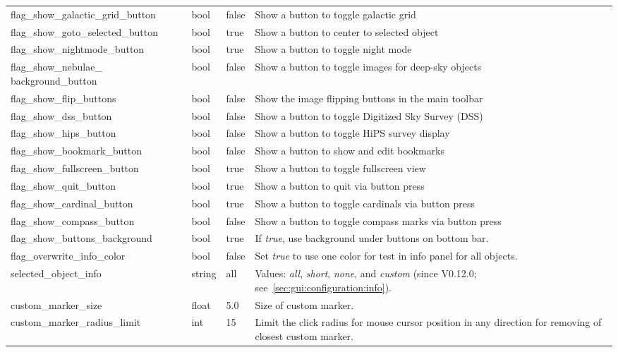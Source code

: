 \begin{longtable}{p{50mm}|l|l|p{55mm}}
flag\_show\_galactic\_grid\_button     & bool  & false & Show a button to toggle galactic grid\\
flag\_show\_goto\_selected\_button     & bool  & true  & Show a button to center to selected object\\
flag\_show\_nightmode\_button          & bool  & true  & Show a button to toggle night mode\\
flag\_show\_nebulae\_ \mbox{background\_button} & bool & false & Show a button to toggle images for deep-sky objects\\%
flag\_show\_flip\_buttons              & bool  & false & Show the image flipping buttons in the main toolbar \\%
flag\_show\_dss\_button                & bool  & false & Show a button to toggle Digitized Sky Survey (DSS)\\%
flag\_show\_hips\_button               & bool  & false & Show a button to toggle HiPS survey display\\%
flag\_show\_bookmark\_button           & bool  & false & Show a button to show and edit bookmarks\\
flag\_show\_fullscreen\_button         & bool  & true  & Show a button to toggle fullscreen view\\
flag\_show\_quit\_button               & bool  & true  & Show a button to quit via button press\\
flag\_show\_cardinal\_button           & bool  & true  & Show a button to toggle cardinals via button press\\
flag\_show\_compass\_button            & bool  & false & Show a button to toggle compass marks via button press\\
flag\_show\_buttons\_background        & bool  & true  & If \emph{true}, use background under buttons on bottom bar.\\\midrule
flag\_overwrite\_info\_color           & bool  & false & Set \emph{true} to use one color for test in info panel for all objects.\\\midrule
%
selected\_object\_info            & string & all  & Values: \emph{all}, \emph{short}, \emph{none}, 
                                                    and \emph{custom} (since V0.12.0; see~\ref{sec:gui:configuration:info}).\\\midrule
custom\_marker\_size             & float   & 5.0 & Size of custom marker.\\%
custom\_marker\_radius\_limit    & int   & 15 & Limit the click radius for mouse cursor position in any direction for removing of closest custom marker.\\\midrule

\end{longtable}
